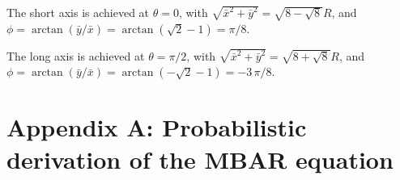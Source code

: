 \documentclass[aip,jcp,preprint,notitlepage, superscriptaddress]{revtex4-1}
\begin{document}
The short axis is achieved at $\theta = 0$,
with
$\sqrt{ {\bar x}^2 + {\bar y}^2 } = \sqrt{ 8 - \sqrt 8 } R$,
and
$\phi = \arctan(\bar y/\bar x) = \arctan \left(\sqrt 2 - 1\right) = \pi/8$.



The long axis is achieved at $\theta = \pi/2$,
with
$\sqrt{ {\bar x}^2 + {\bar y}^2 } = \sqrt{ 8 + \sqrt 8 } R$,
and
$\phi = \arctan(\bar y/\bar x) = \arctan \left(-\sqrt 2 - 1\right) = -3 \, \pi/8$.




\section{Appendix A: Probabilistic derivation of the MBAR equation}
\end{document}
